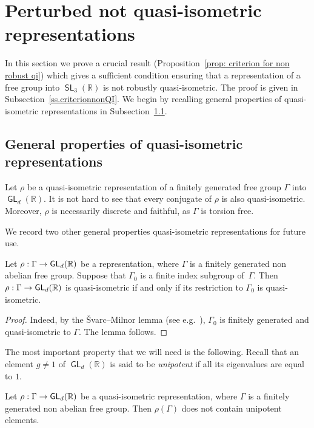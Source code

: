 \documentclass[AHL,Unicode,longabstracts]{cedram}
\DeclareMathOperator{\SL}{\mathsf{SL}}
\DeclareMathOperator{\GL}{\mathsf{GL}}
\newcommand{\R}{\mathbb{R}}
\renewcommand*{\to}{\mathchoice{\longrightarrow}{\rightarrow}{\rightarrow}{\rightarrow}}
\begin{document}
\section{Perturbed not quasi-isometric representations}\label{sec: generalities QI}


In this section we prove a crucial result (Proposition~\ref{prop: criterion for non robust qi}) which gives a sufficient condition ensuring that a representation of a free group into $\SL_3(\R)$ is not robustly quasi-isometric. The proof is given in Subsection~\ref{ss.criterionnonQI}. We begin by recalling general properties of quasi-isometric representations in Subsection~\ref{subsec: propsQIreps}.



\subsection{General properties of quasi-isometric representations}\label{subsec: propsQIreps}

Let $\rho$ be a quasi-isometric representation of a finitely generated free group $\Gamma$ into $\GL_d(\R)$. It is not hard to see that every conjugate of $\rho$ is also quasi-isometric. Moreover, $\rho$ is necessarily discrete and faithful, as $\Gamma$ is torsion free.


We record two other general properties quasi-isometric representations for future use.

\begin{lemm}\label{lem: finite index}
Let $\rho:\Gamma\to\GL_d(\R)$ be a representation, where $\Gamma$ is a finitely generated non abelian free group. Suppose that $\Gamma_0$ is a finite index subgroup of~$\Gamma$. Then $\rho:\Gamma\to\GL_d(\R)$ is quasi-isometric if and only if its restriction to $\Gamma_0$ is quasi-isometric.
\end{lemm}

\begin{proof}
Indeed, by the Švarc--Milnor lemma (see e.g.~\cite[Proposition~8.19]{bridsonhaefliger}), $\Gamma_0$ is finitely generated and quasi-isometric to $\Gamma$. The lemma follows.
\end{proof}

The most important property that we will need is the following. Recall that an element $g\neq 1$ of $\GL_d(\R)$ is said to be \emph{unipotent} if all its eigenvalues are equal to $1$.



\begin{lemm}\label{lem: unipotents}
Let $\rho:\Gamma\to\GL_d(\R)$ be a quasi-isometric representation, where $\Gamma$ is a finitely generated non abelian free group. Then $\rho(\Gamma)$ does not contain unipotent elements.
\end{lemm}
\end{document}
